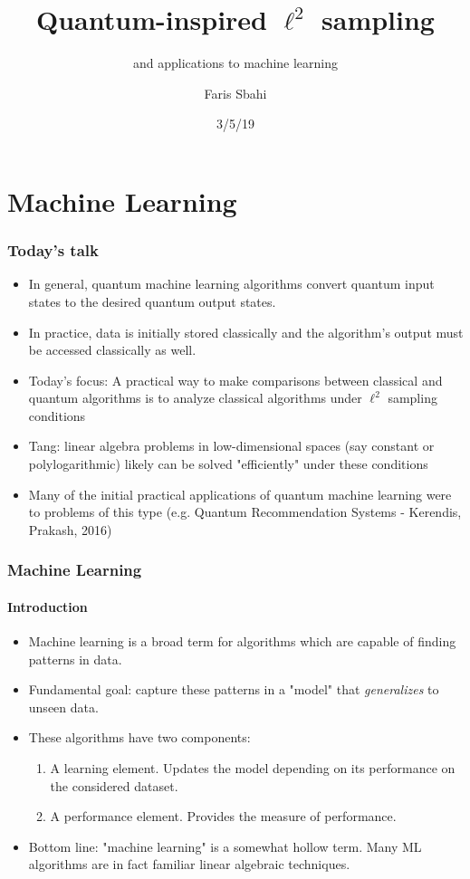 \documentclass{beamer}
\title{Quantum-inspired $\ell^2$ sampling}
\subtitle{and applications to machine learning}
\author[Sbahi] %
{Faris Sbahi}
\date{3/5/19}
\newcommand\0{\mathbf{0}}
\newcommand\<{\langle}
\renewcommand\>{\rangle}
\begin{document}
\maketitle


\section{Machine Learning}

\begin{frame}
\frametitle{Today's talk}
\begin{itemize}
\item In general, quantum machine learning algorithms convert quantum input states to the desired quantum output states. 
\item In practice, data is initially stored classically and the algorithm's output must be accessed classically as well.
\item Today's focus: A practical way to make comparisons between classical and quantum algorithms is to analyze classical algorithms under $\ell^2$ sampling conditions
\item Tang: linear algebra problems in low-dimensional spaces (say constant or polylogarithmic) likely can be solved "efficiently" under these conditions
\item Many of the initial practical applications of quantum machine learning were to problems of this type (e.g. Quantum Recommendation Systems - Kerendis, Prakash, 2016)
\end{itemize}
\end{frame}

\begin{frame}
    \frametitle{Machine Learning}
    \framesubtitle{Introduction}
    \begin{itemize}
    \item Machine learning is a broad term for algorithms which are capable of finding patterns in data.
    \item Fundamental goal: capture these patterns in a "model" that \textit{generalizes} to unseen data.
    \item These algorithms have two components:
    \begin{enumerate}
    \item A learning element. Updates the model depending on its performance on the considered dataset.
    \item A performance element. Provides the measure of performance.
    \end{enumerate}
	\item Bottom line: "machine learning" is a somewhat hollow term. Many ML algorithms are in fact familiar linear algebraic techniques.
    \end{itemize}
    \end{frame}
\end{document}
